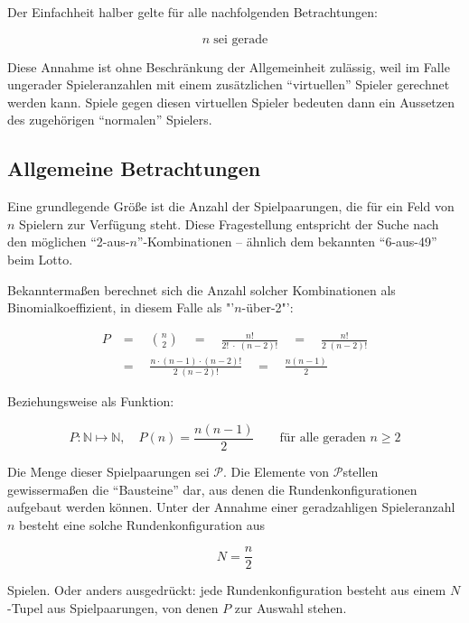 \documentclass[DIV=15, 10pt]{scrartcl}
\newcommand{\PSet}{$\mathcal{P}$}
\begin{document}
Der Einfachheit halber gelte für alle nachfolgenden Betrachtungen:

\[
n \; \text{sei gerade}
\]

Diese Annahme ist ohne Beschränkung der Allgemeinheit zulässig, weil im Falle ungerader Spieleranzahlen mit einem zusätzlichen "`virtuellen"' Spieler gerechnet werden kann. Spiele gegen diesen virtuellen Spieler bedeuten dann ein Aussetzen des zugehörigen "`normalen"' Spielers.

\subsection{Allgemeine Betrachtungen}

Eine grundlegende Größe ist die Anzahl der Spielpaarungen, die für ein Feld von $n$ Spielern zur Verfügung steht. Diese Fragestellung entspricht der Suche nach den möglichen "`2-aus-$n$"'-Kombinationen -- ähnlich dem bekannten "`6-aus-49"' beim Lotto.

Bekanntermaßen berechnet sich die Anzahl solcher Kombinationen als Binomialkoeffizient, in diesem Falle als "'$n$-über-2"':

\begin{align*}
P &= \quad {{n}\choose{2}} \quad = \quad \frac{n!}{2! \; \cdot \; (n - 2)!} \quad
= \quad \frac{n!}{2 \; (n - 2)!} \nonumber \\[3mm]
&=\quad \frac{n \cdot (n - 1) \cdot (n - 2)!}{2 \; (n - 2)!} \quad = \quad
\frac{n(n-1)}{2}
\end{align*}

Beziehungsweise als Funktion:

\begin{equation}
P: \mathbb{N} \mapsto \mathbb{N}, \quad P(n) = \frac{n(n-1)}{2} \qquad
\text{für alle geraden }n \geq 2
\end{equation}

Die Menge dieser Spielpaarungen sei \PSet. Die Elemente von \PSet stellen gewissermaßen die "`Bausteine"' dar, aus denen die Rundenkonfigurationen aufgebaut werden können. Unter der Annahme einer geradzahligen Spieleranzahl $n$ besteht eine solche Rundenkonfiguration aus

\begin{equation}
N = \frac{n}{2}
\end{equation}

Spielen. Oder anders ausgedrückt: jede Rundenkonfiguration besteht aus einem $N$-Tupel  aus Spielpaarungen, von denen $P$ zur Auswahl stehen.
\end{document}
